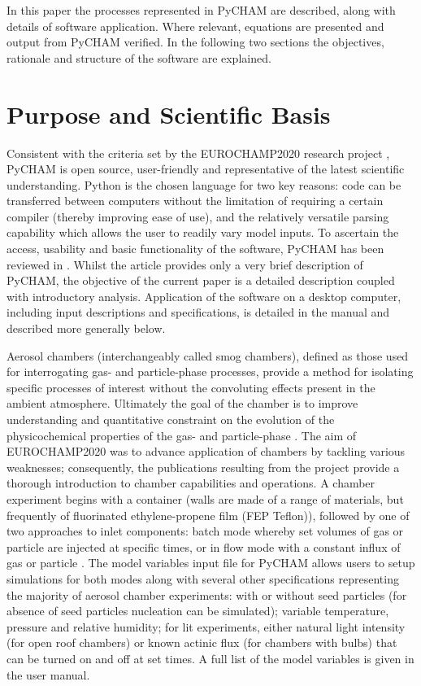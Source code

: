 \documentclass[gmd, manuscript]{copernicus}
\begin{document}
In this paper the processes represented in PyCHAM are described, along with details of software application.  Where relevant, equations are presented and output from PyCHAM verified.  In the following two sections the objectives, rationale and structure of the software are explained.

\section{Purpose and Scientific Basis}\label{sec:purp}

Consistent with the criteria set by the EUROCHAMP2020 research project \citep{EUROCHAMP2020}, PyCHAM is open source, user-friendly and representative of the latest scientific understanding.  Python is the chosen language for two key reasons: code can be transferred between computers without the limitation of requiring a certain compiler (thereby improving ease of use), and the relatively versatile parsing capability which allows the user to readily vary model inputs.  To ascertain the access, usability and basic functionality of the software, PyCHAM has been reviewed in \citet{OMeara2020}.  Whilst the \citet{OMeara2020} article provides only a very brief description of PyCHAM, the objective of the current paper is a detailed description coupled with introductory analysis.   Application of the software on a desktop computer, including input descriptions and specifications, is detailed in the manual and described more generally below.

Aerosol chambers (interchangeably called smog chambers), defined as those used for interrogating gas- and particle-phase processes, provide a method for isolating specific processes of interest without the convoluting effects present in the ambient atmosphere.  Ultimately the goal of the chamber is to improve understanding and quantitative constraint on the evolution of the physicochemical properties of the gas- and particle-phase \citep{Schwantes2017, Charan2019, Hidy2019}.  The aim of EUROCHAMP2020 was to advance application of chambers by tackling various weaknesses; consequently, the publications \citep{EUROCHAMP2020} resulting from the project provide a thorough introduction to chamber capabilities and operations.  A chamber experiment begins with a container (walls are made of a range of materials, but frequently of fluorinated ethylene-propene film (FEP Teflon)), followed by one of two approaches to inlet components: batch mode whereby set volumes of gas or particle are injected at specific times, or in flow mode with a constant influx of gas or particle \citep{Jaoui2014}.  The model variables input file for PyCHAM allows users to setup simulations for both modes along with several other specifications representing the majority of aerosol chamber experiments: with or without seed particles (for absence of seed particles nucleation can be simulated); variable temperature, pressure and relative humidity; for lit experiments, either natural light intensity (for open roof chambers) or known actinic flux (for chambers with bulbs) that can be turned on and off at set times.  A full list of the model variables is given in the user manual.
\end{document}
